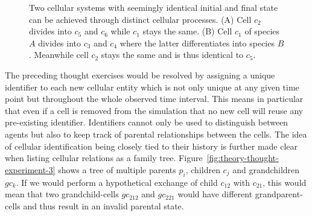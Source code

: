 \begin{figure}
    \centering
    \caption[Undecidability between cellular processes]{
        Two cellular systems with seemingly identical initial and final state can be achieved
        through distinct cellular processes.
        (A) Cell $c_2$ divides into $c_5$ and $c_6$ while $c_1$ stays the same.
        (B) Cell $c_1$ of species $A$ divides into $c_3$ and $c_4$ where the latter differentiates
        into species $B$.
        Meanwhile cell $c_2$ stays the same and is thus identical to $c_5$.
    }
    \label{fig:theory-thought-experiment-2}
\end{figure}

The preceding thought exercises would be resolved by assigning a unique identifier to each new
cellular entity which is not only unique at any given time point but throughout the whole
observed time interval.
This means in particular that even if a cell is removed from the simulation that no new cell
will reuse any pre-existing identifier.
Identifiers cannot only be used to distinguish between agents but also to keep track of
parental relationships between the cells.
The idea of cellular identification being closely tied to their history is further made clear when
listing cellular relations as a family tree.
Figure~\ref{fig:theory-thought-experiment-3} shows a tree of multiple parents $p_i$, children
$c_j$ and grandchildren $gc_k$.
If we would perform a hypothetical exchange of child $c_{12}$ with $c_{21}$, this would mean that
two grandchild-cells $gc_{212}$ and $gc_{221}$ would have different grandparent-cells and thus
result in an invalid parental state.

